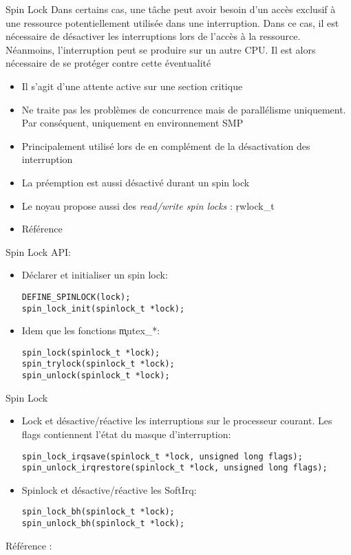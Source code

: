 \begin{frame}[fragile=singleslide]{Spin Lock}
  Dans certains cas, une tâche peut avoir besoin d'un accès exclusif à
  une ressource  potentiellement utilisée dans  une interruption. Dans
  ce cas,  il est nécessaire  de désactiver les interruptions  lors de
  l'accès à la ressource.   Néanmoins, l'interruption peut se produire
  sur un  autre CPU.   Il est alors  nécessaire de se  protéger contre
  cette éventualité
  \begin{itemize}
  \item Il s'agit d'une attente active sur une section critique
  \item  Ne   traite  pas  les   problèmes  de  concurrence   mais  de
    parallélisme    uniquement.   Par   conséquent,    uniquement   en
    environnement SMP
  \item   Principalement  utilisé   lors  de   en  complément   de  la
    désactivation des interruption
  \item La préemption est aussi désactivé durant un spin lock
  \item  Le  noyau propose  aussi  des  \emph{read/write spin locks}  :
    \c{rwlock_t}
  \item Référence 
  \end{itemize}
\end{frame}

\begin{frame}[fragile=singleslide]{Spin Lock}
  API:
  \begin{itemize}
  \item Déclarer et initialiser un spin lock:
    \begin{lstlisting}
DEFINE_SPINLOCK(lock);
spin_lock_init(spinlock_t *lock);
    \end{lstlisting}
  \item Idem que les fonctions \c{mutex_*}:
    \begin{lstlisting}
spin_lock(spinlock_t *lock);
spin_trylock(spinlock_t *lock);
spin_unlock(spinlock_t *lock);
    \end{lstlisting}
  \end{itemize}
\end{frame}

\begin{frame}[fragile=singleslide]{Spin Lock}
  \begin{itemize}
  \item Lock et désactive/réactive les interruptions sur le processeur
    courant.  Les flags contiennent l'état du masque d'interruption:
    \begin{lstlisting}
spin_lock_irqsave(spinlock_t *lock, unsigned long flags);
spin_unlock_irqrestore(spinlock_t *lock, unsigned long flags);
    \end{lstlisting}
  \item Spinlock et désactive/réactive les SoftIrq:
    \begin{lstlisting}
spin_lock_bh(spinlock_t *lock);
spin_unlock_bh(spinlock_t *lock);
    \end{lstlisting}
  \end{itemize}
  Référence :  
\end{frame}

